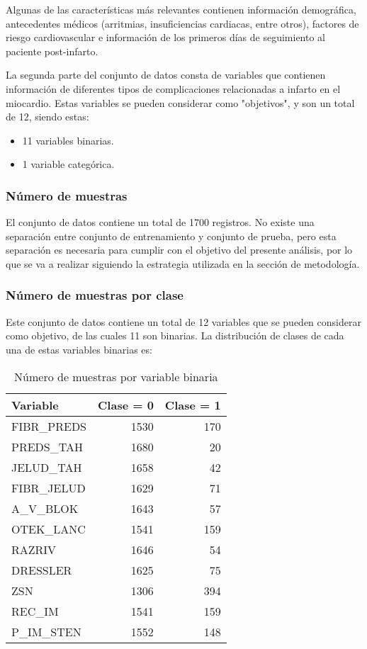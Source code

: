 \documentclass[conference]{IEEEtran}
\begin{document}
Algunas de las características más relevantes contienen información demográfica, antecedentes médicos (arritmias, insuficiencias cardiacas, entre otros), factores de riesgo cardiovascular e información de los primeros días de seguimiento al paciente post-infarto.

La segunda parte del conjunto de datos consta de variables que contienen información de diferentes tipos de complicaciones relacionadas a infarto en el miocardio. Estas variables se pueden considerar como "objetivos", y son un total de 12, siendo estas:
\begin{itemize}
\item 11 variables binarias.
\item 1 variable categórica.
\end{itemize}

\subsubsection{\textbf{Número de muestras}}\label{nmue}
El conjunto de datos contiene un total de 1700 registros. No existe una separación entre conjunto de entrenamiento y conjunto de prueba, pero esta separación es necesaria para cumplir con el objetivo del presente análisis, por lo que se va a realizar siguiendo la estrategia utilizada en la sección de metodología.

\subsubsection{\textbf{Número de muestras por clase}}\label{nmue}
Este conjunto de datos contiene un total de 12 variables que se pueden considerar como objetivo, de las cuales 11 son binarias. La distribución de clases de cada una de estas variables binarias es:

\begin{table}[ht]
\centering
\caption{Número de muestras por variable binaria}
\begin{tabular}{l|r|r}
\textbf{Variable} & \textbf{Clase = 0} & \textbf{Clase = 1} \\
\hline
\rule{0pt}{3ex}
    FIBR\_PREDS & 1530 & 170 \\
    PREDS\_TAH & 1680 & 20 \\
    JELUD\_TAH & 1658 & 42 \\
    FIBR\_JELUD & 1629 & 71 \\
    A\_V\_BLOK & 1643 & 57 \\
    OTEK\_LANC & 1541 & 159 \\
    RAZRIV & 1646 & 54 \\
    DRESSLER & 1625 & 75 \\
    ZSN & 1306 & 394 \\
    REC\_IM & 1541 & 159 \\
    P\_IM\_STEN & 1552 & 148 \\
\end{tabular}
\label{tab:num_samples}
\end{table}
\end{document}
